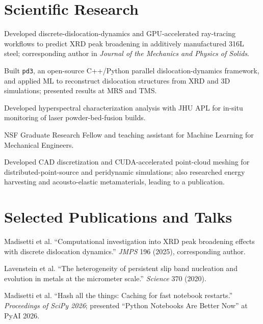 \documentclass{semantic-resume}
\begin{document}
\newpage
\section{Scientific Research}
\begin{resumeitems}
  \item Developed discrete-dislocation-dynamics and GPU-accelerated ray-tracing
    workflows to predict XRD peak broadening in additively manufactured 316L steel;
    corresponding author in \emph{Journal of the Mechanics and Physics of Solids}.
  \item Built \texttt{pd3}, an open-source C++/Python parallel dislocation-dynamics
    framework, and applied ML to reconstruct dislocation structures from XRD and 3D
    simulations; presented results at MRS and TMS.
  \item Developed hyperspectral characterization analysis with JHU APL for in-situ
    monitoring of laser powder-bed-fusion builds.
  \item NSF Graduate Research Fellow and teaching assistant for Machine Learning for
    Mechanical Engineers.
\end{resumeitems}

\begin{resumeitems}
  \item Developed CAD discretization and CUDA-accelerated point-cloud meshing for
    distributed-point-source and peridynamic simulations; also researched energy
    harvesting and acousto-elastic metamaterials, leading to a publication.
\end{resumeitems}

\section{Selected Publications and Talks}
\small
\begin{resumeitems}
  \item Madisetti et al. ``Computational investigation into XRD peak broadening
    effects with discrete dislocation dynamics.'' \emph{JMPS} 196 (2025),
    corresponding author.
  \item Lavenstein et al. ``The heterogeneity of persistent slip band nucleation
    and evolution in metals at the micrometer scale.'' \emph{Science} 370 (2020).
  \item Madisetti et al. ``Hash all the things: Caching for fast notebook restarts.''
    \emph{Proceedings of SciPy 2026}; presented ``Python Notebooks Are Better Now''
    at PyAI 2026.
\end{resumeitems}
\normalsize
\end{document}
